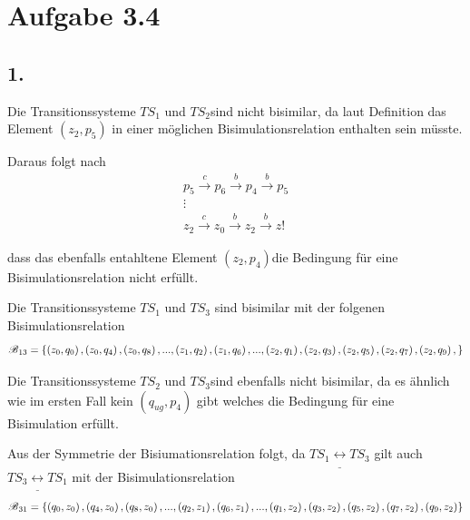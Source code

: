 \documentclass[12pt, paper=a4]{article}
\begin{document}
\section*{Aufgabe 3.4}

\subsection*{1.}

	Die Transitionssysteme $TS_{1}$ und $TS_{2}$sind nicht bisimilar,
	da laut Definition das Element $\left(z_{2},p_{5}\right)$ in einer
	möglichen Bisimulationsrelation enthalten sein müsste. 

	Daraus folgt nach 
	\begin{gather*}
		p_{5}\stackrel{c}{\rightarrow}p_{6}\stackrel{b}{\rightarrow}p_{4}\stackrel{b}{\rightarrow}p_{5}\\
		\vdots\\
		z_{2}\stackrel{c}{\rightarrow}z_{0}\stackrel{b}{\rightarrow}z_{2}\stackrel{b}{\rightarrow}z!
	\end{gather*}


	dass das ebenfalls entahltene Element $\left(z_{2},p_{4}\right)$die
	Bedingung für eine Bisimulationsrelation nicht erfüllt.

	Die Transitionssysteme $TS_{1}$ und $TS_{3}$ sind bisimilar mit
	der folgenen Bisimulationsrelation 
	\[
		\text{\ensuremath{\mathscr{B}}}_{13}=\left\{ \left(z_{0},q_{0}\right),\left(z_{0},q_{4}\right),\left(z_{0},q_{8}		\right),...,\left(z_{1},q_{2}\right),\left(z_{1},q_{6}\right),...,\left(z_{2},q_{1}\right),\left(z_{2},q_{3}			\right),\left(z_{2},q_{5}\right),\left(z_{2},q_{7}\right),\left(z_{2},q_{9}\right),\right\} 
	\]
	
	Die Transitionssysteme $TS_{2}$ und $TS_{3}$sind ebenfalls nicht
	bisimilar, da es ähnlich wie im ersten Fall kein $\left(q_{ug},p_{4}\right)$
	gibt welches die Bedingung für eine Bisimulation erfüllt.

	Aus der Symmetrie der Bisiumationsrelation folgt, da $TS_{1}\underline{\leftrightarrow}TS_{3}$
	gilt auch $TS_{3}\underline{\leftrightarrow}TS_{1}$ mit der Bisimulationsrelation
	\[
	\text{\ensuremath{\mathscr{B}}}_{31}=\left\{ \left(q_{0},z_{0}\right),\left(q_{4},z_{0}\right),\left(q_{8},z_{0}		\right),...,\left(q_{2},z_{1}\right),\left(q_{6},z_{1}\right),...,\left(q_{1},z_{2}\right),\left(q_{3},z_{2}\right),		\left(q_{5},z_{2}\right),\left(q_{7},z_{2}\right),\left(q_{9},z_{2}\right)\right\} 
\]
\end{document}
